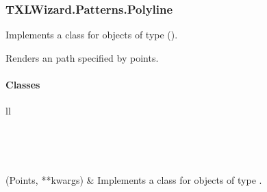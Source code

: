 \documentclass[letterpaper,10pt,english]{sphinxmanual}
\begin{document}
\subsubsection{TXLWizard.Patterns.Polyline}
\label{Chapters/PythonModuleReference/Patterns/TXLWizard.Patterns.Polyline:module-TXLWizard.Patterns.Polyline}\label{Chapters/PythonModuleReference/Patterns/TXLWizard.Patterns.Polyline::doc}\label{Chapters/PythonModuleReference/Patterns/TXLWizard.Patterns.Polyline:txlwizard-patterns-polyline}
Implements a class for  objects of type  ().

Renders an path specified by points.


\paragraph{Classes}
\label{Chapters/PythonModuleReference/Patterns/TXLWizard.Patterns.Polyline:classes}
\begin{longtable}{ll}
\hline
\endfirsthead

%
{{}} \\
\hline
\endhead

\hline {} \\ \hline
\endfoot

\endlastfoot


{\hyperref[Chapters/PythonModuleReference/Patterns/TXLWizard.Patterns.Polyline:TXLWizard.Patterns.Polyline.Polyline]{}}(Points, **kwargs)
 & 
Implements a class for  objects of type .
\\
\hline\end{longtable}

\end{document}
